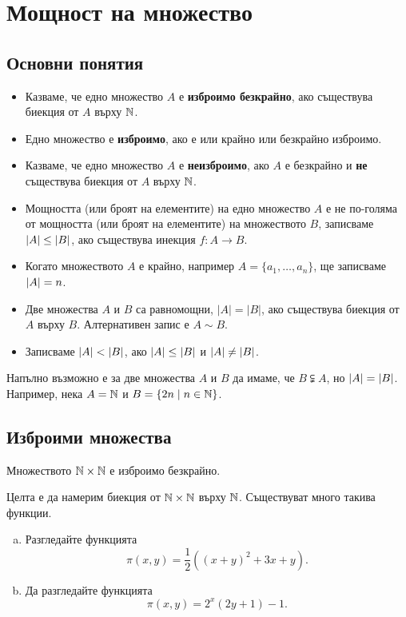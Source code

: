 \chapter{Мощност на множество}

\section{Основни понятия}

\begin{itemize}
\item 
  Казваме, че едно множество $A$ е {\bf изброимо безкрайно}, ако съществува 
  биекция от $A$ върху $\mathbb{N}$.
\item
  Едно множество е {\bf изброимо}, ако е или крайно или безкрайно изброимо.
\item
  Казваме, че едно множество $A$ е {\bf неизброимо}, ако $A$ е безкрайно и {\bf не} съществува 
  биекция от $A$ върху $\mathbb{N}$.
\item
  Мощността (или броят на елементите) на едно множество $A$ е не по-голяма от мощността (или броят на елементите) на множеството $B$, 
  записваме $\lvert{A}\rvert \leq \lvert{B}\rvert$,
  ако съществува инекция $f:A \to B$.
\item
  Когато множеството $A$ е крайно, например $A = \{a_1,\dots,a_n\}$, 
  ще записваме $\lvert{A}\rvert = n$.
\item
  Две множества $A$ и $B$ са равномощни, $|A| = |B|$, ако съществува биекция от $A$ върху $B$.
  Алтернативен запис е $A \sim B$.
\item
  Записваме $\lvert{A}\rvert < \lvert{B}\rvert$, ако $\lvert{A}\rvert \leq \lvert{B}\rvert$ и $\lvert{A}\rvert \neq \lvert{B}\rvert$.
\end{itemize}

\begin{framed}
\begin{remark}
  Напълно възможно е за две множества $A$ и $B$ да имаме, че  $B \subsetneqq A$, но $\lvert{A}\rvert = \lvert{B}\rvert$.
  Например, нека $A = \mathbb{N}$ и $B = \{2n\mid n\in\mathbb{N}\}$.
\end{remark}
\end{framed}


\section{Изброими множества}

\begin{prop}
  Множеството $\mathbb{N}\times\mathbb{N}$ е изброимо безкрайно.
\end{prop}
\begin{hint}
  Целта е да намерим биекция от $\mathbb{N}\times \mathbb{N}$ върху $\mathbb{N}$.
  Съществуват много такива функции.
  \begin{enumerate}[a)]
  \item 
    Разгледайте функцията 
    \[\pi(x,y) = \frac{1}{2}((x+y)^2+3x+y).\]
  \item
    Да разгледайте функцията
    \[\pi(x,y) = 2^x(2y+1)-1.\]
  \end{enumerate}
\end{hint}

